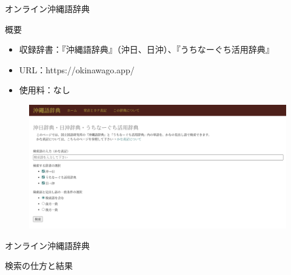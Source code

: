 \documentclass[14pt]{beamer}
\begin{document}
\begin{frame}{オンライン沖縄語辞典}
  \begin{block}{概要}
    \begin{itemize}
    \item  収録辞書：『沖縄語辞典』（沖日、日沖）、『うちなーぐち活用辞典』
    \item  URL：https://okinawago.app/
    \item 使用料：なし
    \end{itemize}
    \begin{figure}[ht]
      \centering
      \includegraphics[height=0.35\paperheight,width=0.5\paperwidth]{okinawago-app-top-page.png}
    \end{figure}
  \end{block}
\end{frame}

\begin{frame}{オンライン沖縄語辞典}
  \begin{block}{検索の仕方と結果}
  \end{block}
\end{frame}
\end{document}
